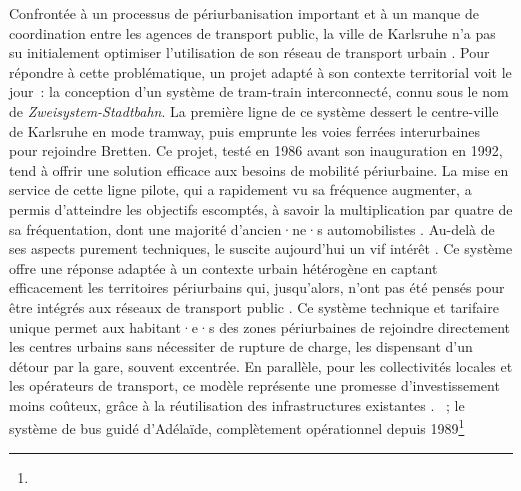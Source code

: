\begin{refsegment}
{    Confrontée à un processus de périurbanisation important et à un manque de coordination entre les agences de transport public, la ville de Karlsruhe n’a pas su initialement optimiser l’utilisation de son réseau de transport urbain \textcolor{blue}{\autocite[p.~343-360 (chapitre 13)]{cervero_transit_1998}}. Pour répondre à cette problématique, un projet adapté à son contexte territorial voit le jour~: la conception d’un système de tram-train interconnecté, connu sous le nom de \textsl{Zweisystem-Stadtbahn}. La première ligne de ce système dessert le centre-ville de Karlsruhe en mode tramway, puis emprunte les voies ferrées interurbaines pour rejoindre Bretten. Ce projet, testé en 1986 avant son inauguration en 1992, tend à offrir une solution efficace aux besoins de mobilité périurbaine. La mise en service de cette ligne pilote, qui a rapidement vu sa fréquence augmenter, a permis d’atteindre les objectifs escomptés, à savoir la multiplication par quatre de sa fréquentation, dont une majorité d'ancien·ne·s automobilistes \textcolor{blue}{\autocite[41]{beaucire_reseau_2000}}. Au-delà de ses aspects purement techniques, le  suscite aujourd’hui un vif intérêt \textcolor{blue}{\autocite[41]{beaucire_reseau_2000}}. Ce système offre une réponse adaptée à un contexte urbain hétérogène en captant efficacement les territoires périurbains qui, jusqu’alors, n’ont pas été pensés pour être intégrés aux réseaux de transport public \textcolor{blue}{\autocite[57-65]{grisot_manifeste_2020}}. Ce système technique et tarifaire unique permet aux habitant·e·s des zones périurbaines de rejoindre directement les centres urbains sans nécessiter de rupture de charge, les dispensant d’un \gls{détour} par la gare, souvent excentrée. En parallèle, pour les collectivités locales et les opérateurs de transport, ce modèle représente une promesse d’investissement moins coûteux, grâce à la réutilisation des infrastructures existantes \textcolor{blue}{\autocite[17]{lhostis_multi-criteria_2017}}.
}~; le système de bus guidé d'Adélaïde, complètement opérationnel depuis 1989\footnote{
}
\end{refsegment}
